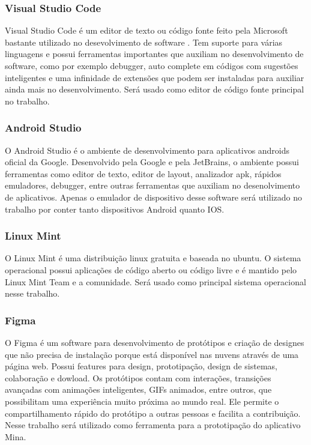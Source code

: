 \subsubsection{Visual Studio Code}

Visual Studio Code é um editor de texto ou código fonte feito pela Microsoft bastante utilizado no desevolvimento de software \cite{vscode2015}. Tem suporte para várias linguagens e possui ferramentas importantes que auxiliam no desenvolvimento de software, como por exemplo debugger, auto complete em códigos com sugestões inteligentes e uma infinidade de extensões que podem ser instaladas para auxiliar ainda mais no desenvolvimento. Será usado como editor de código fonte principal no trabalho. 

\subsubsection{Android Studio}

O Android Studio \cite{android2020} é o ambiente de desenvolvimento para aplicativos androids oficial da Google. Desenvolvido pela Google e pela JetBrains, o ambiente possui ferramentas como editor de texto, editor de layout, analizador apk, rápidos emuladores, debugger, entre outras ferramentas que auxiliam no desenolvimento de aplicativos. Apenas o emulador de dispositivo desse software será utilizado no trabalho por conter tanto dispositivos Android quanto IOS.

\subsubsection{Linux Mint}
O Linux Mint \cite{lm2020} é uma distribuição linux gratuita e baseada no ubuntu. O sistema operacional possui aplicações de código aberto ou código livre e é mantido pelo Linux Mint Team e a comunidade. Será usado como principal sistema operacional nesse trabalho.

\subsubsection{Figma}

O Figma \cite{figma2020} é um software para desenvolvimento de protótipos e criação de designes que não precisa de instalação porque está disponível nas nuvens através de uma página web. Possui features para design, prototipação, design de sistemas, colaboração e dowload. Os protótipos contam com interações, transições avançadas com animações inteligentes, GIFs animados, entre outros, que possibilitam uma experiência muito próxima ao mundo real. Ele permite o compartilhamento rápido do protótipo a outras pessoas e facilita a contribuição. Nesse trabalho será utilizado como ferramenta para a prototipação do aplicativo Mina. 

